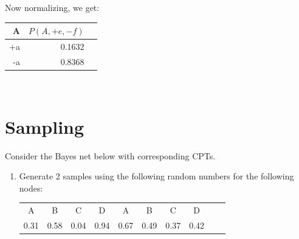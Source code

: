 \documentclass[12pt]{article}
\begin{document}
Now normalizing, we get:
\begin{tabular}{|r|r|r|} \hline
 A  & $P(A,+e,-f)$ \\ \hline
+a &  0.1632    \\ \hline
-a &  0.8368    \\ \hline
\end{tabular}\\



\clearpage

\section{Sampling}

Consider the Bayes net below with corresponding CPTs.  

\begin{enumerate}

\item Generate 2 samples using the following random numbers for the following nodes:

\begin{center}
\begin{tabular}{|c|c|c|c|c|c|c|c|c|c|} \hline
A & B & C & D & A & B & C & D \\
0.31 & 0.58 & 0.04 & 0.94 & 0.67 & 0.49 & 0.37 & 0.42 \\ \hline
\end{tabular}
\end{center}


\end{enumerate}
\end{document}

